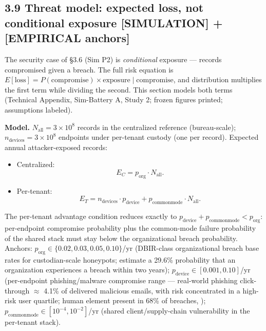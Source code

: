 \documentclass[11pt,twocolumn]{article}
\providecommand{\tightlist}{\setlength{\itemsep}{0pt}\setlength{\parskip}{0pt}}
\begin{document}
\subsection*{3.9 Threat model: expected loss, not conditional exposure
{[}SIMULATION{]} + {[}EMPIRICAL
anchors{]}}

The security case of §3.6 (Sim P2) is
\emph{conditional} exposure --- records compromised given a breach. The full
risk equation is
\(E[\mathrm{loss}] = P(\mathrm{compromise}) \times \mathrm{exposure} \mid \mathrm{compromise}\),
and distribution multiplies the first term while dividing the second.
This section models both terms (Technical Appendix, Sim-Battery A, Study
2; frozen figures printed; assumptions labeled).

\textbf{Model.} \(N_{\mathrm{all}} = 3\times 10^{8}\) records in the
centralized reference (bureau-scale);
\(n_{\mathrm{devices}} = 3\times 10^{8}\) endpoints under per-tenant
custody (one per record). Expected annual attacker-exposed records:

\begin{itemize}
\tightlist
\item
  Centralized: \begin{equation} E_C = p_{\mathrm{org}} \cdot N_{\mathrm{all}}. \label{eq:ec} \end{equation}
\item
  Per-tenant: \begin{equation} E_T = n_{\mathrm{devices}} \cdot p_{\mathrm{device}} + p_{\mathrm{commonmode}} \cdot N_{\mathrm{all}}. \label{eq:et} \end{equation}
\end{itemize}

The per-tenant advantage condition reduces exactly to
\(p_{\mathrm{device}} + p_{\mathrm{commonmode}} < p_{\mathrm{org}}\):
per-endpoint compromise probability plus the common-mode failure
probability of the shared stack must stay below the organizational
breach probability. Anchors:
\(p_{\mathrm{org}} \in \{0.02, 0.03, 0.05, 0.10\}\)/yr (DBIR-class
organizational breach base rates for custodian-scale honeypots;
\citet{ibm2019} estimate a 29.6\% probability that an organization
experiences a breach within two years);
\(p_{\mathrm{device}} \in [0.001, 0.10]\)/yr (per-endpoint
phishing/malware compromise range --- real-world phishing click-through
\(\approx\) 4.1\% of delivered malicious emails, with risk concentrated
in a high-risk user quartile; human element present in 68\% of breaches,
\citealp{verizon2024});
\(p_{\mathrm{commonmode}} \in [10^{-4}, 10^{-2}]\)/yr (shared
client/supply-chain vulnerability in the per-tenant stack).
\end{document}
